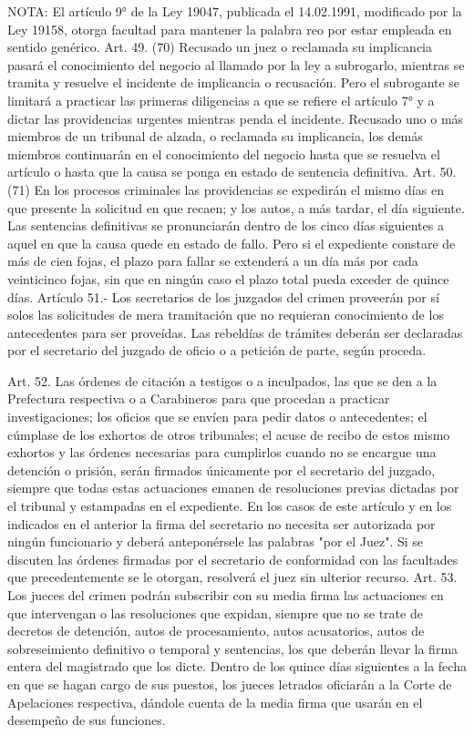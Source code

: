 NOTA:
      El artículo 9° de la Ley 19047, publicada el 14.02.1991, modificado por la Ley 19158, otorga facultad para mantener la palabra reo por estar empleada en sentido genérico.
    Art. 49. (70) Recusado un juez o reclamada su implicancia pasará el conocimiento del negocio al llamado por la ley a subrogarlo, mientras se tramita y resuelve el incidente de implicancia o recusación. Pero el subrogante se limitará a practicar las primeras diligencias a que se refiere el artículo 7° y a dictar las providencias urgentes mientras penda el incidente.
    Recusado uno o más miembros de un tribunal de alzada, o reclamada su implicancia, los demás miembros continuarán en el conocimiento del negocio hasta que se resuelva el artículo o hasta que la causa se ponga en estado de sentencia definitiva.
    Art. 50. (71) En los procesos criminales las providencias se expedirán el mismo días en que presente la solicitud en que recaen; y los autos, a más tardar, el día siguiente.
    Las sentencias definitivas se pronunciarán dentro de los cinco días siguientes a aquel en que la causa quede en estado de fallo. Pero si el expediente constare de más de cien fojas, el plazo para fallar se extenderá a un día más por cada veinticinco fojas, sin que en ningún caso el plazo total pueda exceder de quince días.
    Artículo 51.- Los secretarios de los juzgados del crimen proveerán por sí solos las solicitudes de mera tramitación que no requieran conocimiento de los antecedentes para ser proveídas.
    Las rebeldías de trámites deberán ser declaradas por el secretario del juzgado de oficio o a petición de parte, según proceda.

    Art. 52. Las órdenes de citación a testigos o a inculpados, las que se den a la Prefectura respectiva o a Carabineros para que procedan a practicar investigaciones; los oficios que se envíen para pedir datos o antecedentes; el cúmplase de los exhortos de otros tribunales; el acuse de recibo de estos mismo exhortos y las órdenes necesarias para cumplirlos cuando no se encargue una detención o prisión, serán firmados únicamente por el secretario del juzgado, siempre que todas estas actuaciones emanen de resoluciones previas dictadas por el tribunal y estampadas en el expediente.
    En los casos de este artículo y en los indicados en el anterior la firma del secretario no necesita ser autorizada por ningún funcionario y deberá anteponérsele las palabras "por el Juez".
    Si se discuten las órdenes firmadas por el secretario de conformidad con las facultades que precedentemente se le otorgan, resolverá el juez sin ulterior recurso.
    Art. 53. Los jueces del crimen podrán subscribir con su media firma las actuaciones en que intervengan o las resoluciones que expidan, siempre que no se trate de decretos de detención, autos de procesamiento, autos acusatorios, autos de sobreseimiento definitivo o temporal y sentencias, los que deberán llevar la firma entera del magistrado que los dicte.
    Dentro de los quince días siguientes a la fecha en que se hagan cargo de sus puestos, los jueces letrados oficiarán a la Corte de Apelaciones respectiva, dándole cuenta de la media firma que usarán en el desempeño de sus funciones.

